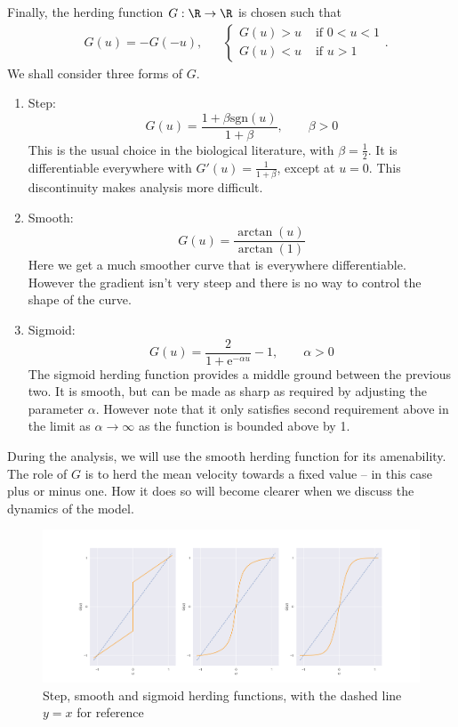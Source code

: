 		Finally, the herding function $G:\R \to \R$ is chosen such that
		\begin{align*}
			&G(u)=-G(-u),&& {\begin{cases}
								G(u)>u & \text{ if } 0< u <1\\
								G(u)<u & \text{ if } u > 1
				   		   \end{cases}}.
		\end{align*}
		We shall consider three forms of $G$.
		\begin{enumerate}
			\item Step:
			\[
				G(u) = \frac{1+\beta \mathrm{sgn}(u)}{1+\beta}, \qquad \beta > 0	
			\]
			This is the usual choice in the biological literature, with \(\beta = \frac{1}{2}\). It is differentiable everywhere with $G'(u) = \frac{1}{1+\beta}$, except at $u=0$. This discontinuity makes analysis more difficult.
			\item Smooth:
			\[
				G(u) = \frac{\arctan(u)}{\arctan(1)}
			\]
			Here we get a much smoother curve that is everywhere differentiable. However the gradient isn't very steep and there is no way to control the shape of the curve.
			\item Sigmoid:
			\[
				G(u) = \frac{2}{1+\mathrm{e}^{-\alpha u}} - 1 , \qquad \alpha >0
			\]
			The sigmoid herding function provides a middle ground between the previous two. It is smooth, but can be made as sharp as required by adjusting the parameter $\alpha$. However note that it only satisfies second requirement above in the limit as $\alpha \to \infty$ as the function is bounded above by 1.
		\end{enumerate}
		During the analysis, we will use the smooth herding function for its amenability. The role of $G$ is to herd the mean velocity towards a fixed value -- in this case plus or minus one. How it does so will become clearer when we discuss the dynamics of the model.
        \begin{figure}
            \centering
            \includegraphics[width=\linewidth]{Figures/herdingfunctions}
            \caption{Step, smooth and sigmoid herding functions, with the dashed line $y=x$ for reference}
            \label{fig:herdingfunctions}
        \end{figure}
